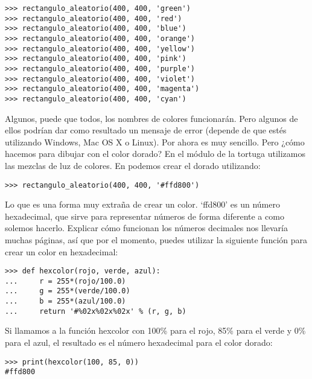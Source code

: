 \begin{listing}
\begin{verbatim}
>>> rectangulo_aleatorio(400, 400, 'green')
>>> rectangulo_aleatorio(400, 400, 'red')
>>> rectangulo_aleatorio(400, 400, 'blue')
>>> rectangulo_aleatorio(400, 400, 'orange')
>>> rectangulo_aleatorio(400, 400, 'yellow')
>>> rectangulo_aleatorio(400, 400, 'pink')
>>> rectangulo_aleatorio(400, 400, 'purple')
>>> rectangulo_aleatorio(400, 400, 'violet')
>>> rectangulo_aleatorio(400, 400, 'magenta')
>>> rectangulo_aleatorio(400, 400, 'cyan')
\end{verbatim}
\end{listing}

Algunos, puede que todos, los nombres de colores funcionarán. Pero algunos de ellos podrían dar como resultado un mensaje de error (depende de que estés utilizando Windows, Mac OS X o Linux). Por ahora es muy sencillo. Pero ¿cómo hacemos para dibujar con el color dorado?  En el módulo de la tortuga utilizamos las mezclas de luz de colores.  En  podemos crear el dorado utilizando:

\begin{listing}
\begin{verbatim}
>>> rectangulo_aleatorio(400, 400, '#ffd800')
\end{verbatim}
\end{listing}

Lo que es una forma muy extraña de crear un color. `ffd800' es un número hexadecimal, que sirve para representar números de forma diferente a como solemos hacerlo.  Explicar cómo funcionan los números decimales nos llevaría muchas páginas, así que por el momento, puedes utilizar la siguiente función para crear un color en hexadecimal:

\begin{listing}
\begin{verbatim}
>>> def hexcolor(rojo, verde, azul):
...     r = 255*(rojo/100.0)
...     g = 255*(verde/100.0)
...     b = 255*(azul/100.0)
...     return '#%02x%02x%02x' % (r, g, b)
\end{verbatim}
\end{listing}

Si llamamos a la función hexcolor con 100\% para el rojo, 85\% para el verde y 0\% para el azul, el resultado es el número hexadecimal para el color dorado:

\begin{listing}
\begin{verbatim}
>>> print(hexcolor(100, 85, 0))
#ffd800
\end{verbatim}
\end{listing}

